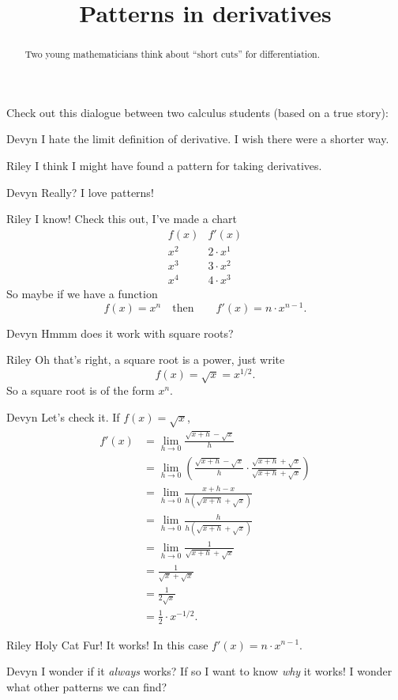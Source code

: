 \documentclass{ximera}
\title[Break-Ground:]{Patterns in derivatives}
\begin{document}
\begin{abstract}
Two young mathematicians think about ``short cuts'' for differentiation. 
\end{abstract}
\maketitle

Check out this dialogue between two calculus students (based on a true
story):

\begin{dialogue}
\item[Devyn] I hate the limit definition of derivative.  I wish there
  were a shorter way.
\item[Riley] I think I might have found a pattern for taking
  derivatives.
\item[Devyn] Really? I love patterns!
\item[Riley] I know! Check this out, I've made a chart
{  \renewcommand*{\arraystretch}{1.3}
  \[
  \begin{array}{c|c}
    f(x) & f'(x)\\ \hline
    x^2 & 2\cdot x^1\\
    x^3 & 3\cdot x^2\\
    x^4 & 4\cdot x^3
  \end{array}
  \]
  }
  So maybe if we have a function
  \[
  f(x) = x^n\quad\text{then}\qquad f'(x) = n\cdot x^{n-1}.
  \]
\item[Devyn] Hmmm does it work with square roots?
\item[Riley] Oh that's right, a square root is a power, just write
  \[
  f(x) = \sqrt{x} = x^{1/2}.
  \]
  So a square root is of the form $x^n$.
\item[Devyn] Let's check it. If $f(x) = \sqrt{x}$,
  \begin{align*}
    f'(x) &= \lim_{h\to 0} \frac{\sqrt{x+h} -\sqrt{x}}{h}\\
    &= \lim_{h\to 0} \left(\frac{\sqrt{x+h} - \sqrt{x}}{h}\cdot \frac{\sqrt{x+h} + \sqrt{x}}{\sqrt{x+h} + \sqrt{x}}\right)\\
    &= \lim_{h\to 0} \frac{x+h - x}{h(\sqrt{x+h} + \sqrt{x})}\\
    &= \lim_{h\to 0} \frac{h}{h(\sqrt{x+h} + \sqrt{x})}\\
    &= \lim_{h\to 0} \frac{1}{\sqrt{x+h} + \sqrt{x}}\\
    &= \frac{1}{\sqrt{x} + \sqrt{x}}\\
    &= \frac{1}{2\sqrt{x}}\\
    &= \frac{1}{2}\cdot x^{-1/2}.
  \end{align*}
\item[Riley] Holy Cat Fur! It works! In this case $f'(x) = n\cdot
  x^{n-1}$.
  \item[Devyn] I wonder if it \textit{always} works? If so I want to
    know \textit{why} it works! I wonder what other patterns we can
    find?
\end{dialogue}
\end{document}
